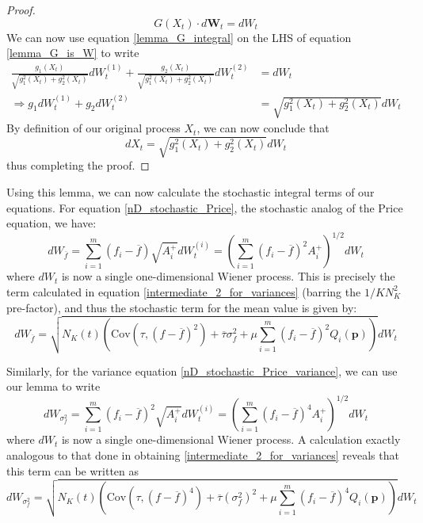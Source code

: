 \begin{proof}
\begin{equation}
	\label{lemma_G_is_W}
	G(X_t) \cdot d\mathbf{W}_t = dW_t
\end{equation}
We can now use equation \eqref{lemma_G_integral} on the LHS of equation \eqref{lemma_G_is_W} to write
\begin{align}
	\frac{g_1(X_t)}{\sqrt{g_1^2(X_t) + g_2^2(X_t)}} dW^{(1)}_t + \frac{g_2(X_t)}{\sqrt{g_1^2(X_t) + g_2^2(X_t)}}dW^{(2)}_t &= dW_t\\
	\Rightarrow g_1 dW^{(1)}_t + g_2dW^{(2)}_t &= \sqrt{g_1^2(X_t) + g_2^2(X_t)}dW_t
\end{align}
By definition of our original process $X_t$, we can now conclude that
\begin{equation}
	dX_t = \sqrt{g_1^2(X_t) + g_2^2(X_t)}dW_t
\end{equation}
thus completing the proof.
\end{proof}
Using this lemma, we can now calculate the stochastic integral terms of our equations. For equation \eqref{nD_stochastic_Price}, the stochastic analog of the Price equation, we have:
\begin{equation}
dW_{\overline{f}} = \sum\limits_{i=1}^{m}\left(f_i-\overline{f}\right)\sqrt{A_i^+}dW_{t}^{(i)} = \left(\sum\limits_{i=1}^{m}\left(f_i-\overline{f}\right)^2A_i^+\right)^{1/2}dW_t
\end{equation}
where $dW_t$ is now a single one-dimensional Wiener process. This is precisely the term calculated in equation \eqref{intermediate_2_for_variances} (barring the $1/KN_K^2$ pre-factor), and thus the stochastic term for the mean value is given by:
\begin{equation}
	\label{nD_stoch_Price_noise_term_alt_representation}
	dW_{\overline{f}} = \sqrt{N_K(t) \left(\textrm{Cov}(\tau,\left(f - \overline{f}\right)^2) + \overline{\tau}\sigma^2_{f} +\mu \sum\limits_{i=1}^{m}\left(f_i - \overline{f}\right)^2Q_i(\mathbf{p})\right)}dW_t
\end{equation}

Similarly, for the variance equation \eqref{nD_stochastic_Price_variance}, we can use our lemma to write
\begin{equation}
dW_{\sigma^2_f} = \sum\limits_{i=1}^{m}\left(f_i - \overline{f}\right)^2\sqrt{A_i^+}dW_{t}^{(i)} = \left(\sum\limits_{i=1}^{m}\left(f_i - \overline{f}\right)^4 A_i^+\right)^{1/2}dW_t
\end{equation}
where $dW_t$ is now a single one-dimensional Wiener process. A calculation exactly analogous to that done in obtaining \eqref{intermediate_2_for_variances} reveals that this term can be written as
\begin{equation}
	\label{nD_stoch_variance_Price_noise_term_alt_representation}
	dW_{\sigma^2_f} = \sqrt{N_K(t) \left(\textrm{Cov}(\tau,\left(f - \overline{f}\right)^4) + \overline{\tau}(\sigma^2_{f})^2 +\mu \sum\limits_{i=1}^{m}\left(f_i - \overline{f}\right)^4Q_i(\mathbf{p})\right)}dW_t
\end{equation}